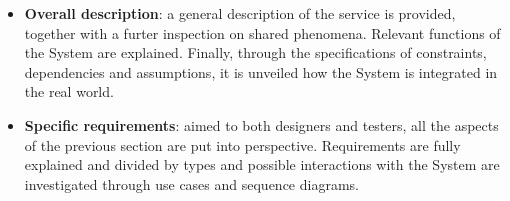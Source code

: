 \begin{itemize}
    \item \textbf{Overall description}: a general description of the 
    service is provided, together with a furter inspection on shared 
    phenomena. Relevant functions of the System are explained. 
    Finally, through the specifications of constraints, dependencies 
    and assumptions, it is unveiled how the System is integrated 
    in the real world.
    \item \textbf{Specific requirements}: aimed to both designers 
    and testers, all the aspects of the previous section are put 
    into perspective. Requirements are fully explained and divided 
    by types and possible interactions with the System are investigated 
    through use cases and sequence diagrams.
\end{itemize}
